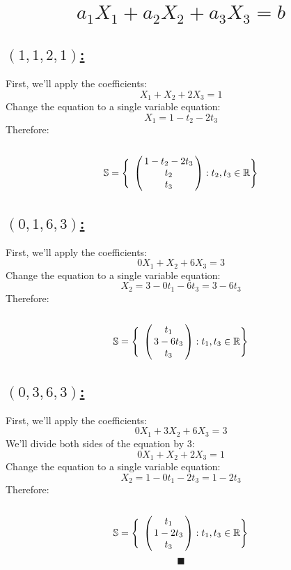 \documentclass[a4paper, 12pt]{article}
\newcommand{\sub}[1]{\subsection{\underline{#1}}}
\newcommand{\?}{\stackrel{?}{=}}
\newcommand{\R}{\ensuremath{\mathbb{R}}}
\renewcommand{\qed}{$$\blacksquare$$}
\begin{document}
\setcounter{section}{48}
\section{$$ a_1X_1 +  a_2X_2+ a_3X_3 = b$$}
\sub{$(1,1,2,1)$:}
First, we'll apply the coefficients:
$$ X_1 +  X_2+ 2X_3 = 1 $$
Change the equation to a single variable equation:
$$ X_1 = 1 - t_2 - 2t_3 $$
Therefore: $$
\mathbb{S} = \Bigg{\{}
    \bordermatrix {
    &        \cr
    & 1 - t_2 - 2t_3    \cr
    & t_2    \cr
    & t_3    \cr
    }
:
t_2, t_3 \in {\R}
\Bigg{\}} $$

\sub{$(0,1,6,3)$:}
First, we'll apply the coefficients:
$$ 0X_1 +  X_2+ 6X_3 = 3 $$
Change the equation to a single variable equation:
$$ X_2 = 3-0t_1-6t_3 = 3-6t_3 $$
Therefore: $$
\mathbb{S} = \Bigg{\{}
    \bordermatrix {
    &        \cr
    & t_1    \cr
    & 3-6t_3    \cr
    & t_3    \cr
    }
:
t_1, t_3 \in {\R}
\Bigg{\}} $$

\sub{$(0,3,6,3)$:}
First, we'll apply the coefficients:
$$ 0X_1 +  3X_2+ 6X_3 = 3 $$
We'll divide both sides of the equation by $3$: $$ 0X_1 +  X_2+ 2X_3 = 1 $$
Change the equation to a single variable equation: $$ X_2 = 1 - 0t_1 - 2t_3 = 1-2t_3 $$
Therefore: $$
\mathbb{S} = \Bigg{\{}
    \bordermatrix {
    &        \cr
    & t_1    \cr
    & 1-2t_3    \cr
    & t_3    \cr
    }
:
t_1, t_3 \in {\R}
\Bigg{\}} $$
\qed

\end{document}
